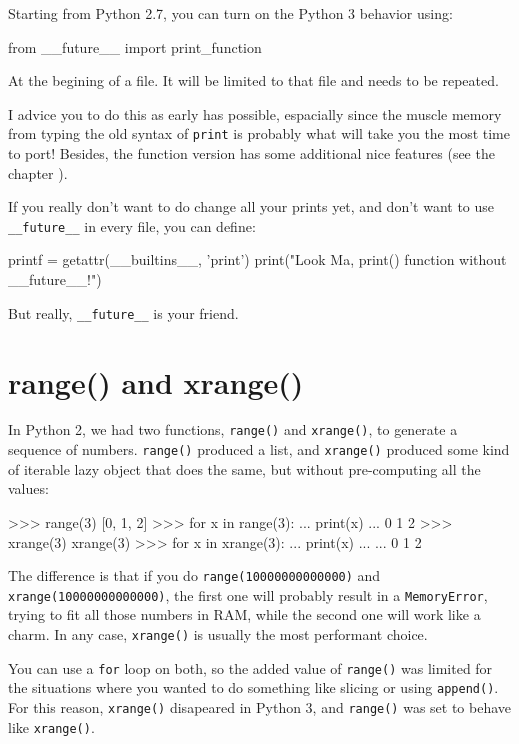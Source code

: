 Starting from Python 2.7, you can turn on the Python 3 behavior using:

\begin{py2and3}
from __future__ import print_function
\end{py2and3}

At the begining of a file. It will be limited to that file and needs to be repeated.

I advice you to do this as early has possible, espacially since the muscle memory from typing the old syntax of \lstinline{print} is probably what will take you the most time to port! Besides, the function version has some additional nice features (see the chapter ).

If you really don't want to do change all your prints yet, and don't want to use \lstinline{__future__} in every file, you can define:

\begin{py2and3}
printf = getattr(__builtins__, 'print')
print("Look Ma, print() function without __future__!")
\end{py2and3}

But really, \lstinline{__future__} is your friend.

\section{range() and xrange()}

In Python 2, we had two functions, \lstinline{range()} and \lstinline{xrange()}, to generate a sequence of numbers. \lstinline{range()} produced a list, and \lstinline{xrange()} produced some kind of iterable lazy object that does the same, but without pre-computing all the values:

\begin{py2}
>>> range(3)
[0, 1, 2]
>>> for x in range(3):
...     print(x)
...
0
1
2
>>> xrange(3)
xrange(3)
>>> for x in xrange(3):
...     print(x)
...
...
0
1
2
\end{py2}

The difference is that if you do \lstinline{range(10000000000000)} and \lstinline{xrange(10000000000000)}, the first one will probably result in a \lstinline{MemoryError}, trying to fit all those numbers in RAM, while the second one will work like a charm. In any case, \lstinline{xrange()} is usually the most performant choice.

You can use a \lstinline{for} loop on both, so the added value of \lstinline{range()} was limited for the situations where you wanted to do something like slicing or using \lstinline{append()}. For this reason, \lstinline{xrange()} disapeared in Python 3, and \lstinline{range()} was set to behave like \lstinline{xrange()}.

